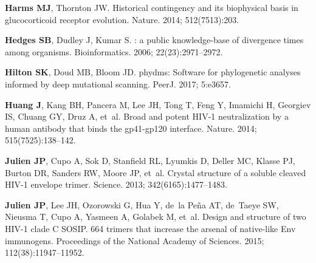 \documentclass[9pt]{elife}
\begin{document}
\begin{thebibliography}{114}
\textbf{\color{eLifeMediumGrey} Harms MJ}, Thornton JW.
\newblock Historical contingency and its biophysical basis in glucocorticoid
  receptor evolution.
\newblock Nature.  2014; 512(7513):203.

\textbf{\color{eLifeMediumGrey} Hedges SB}, Dudley J, Kumar S.
: a public knowledge-base of divergence times among
  organisms.
\newblock Bioinformatics.  2006; 22(23):2971--2972.

\textbf{\color{eLifeMediumGrey} Hilton SK}, Doud MB, Bloom JD.
\newblock phydms: Software for phylogenetic analyses informed by deep
  mutational scanning.
\newblock PeerJ.  2017; 5:e3657.

\textbf{\color{eLifeMediumGrey} Huang J}, Kang BH, Pancera M, Lee JH, Tong T,
  Feng Y, Imamichi H, Georgiev IS, Chuang GY, Druz A, et~al.
\newblock Broad and potent HIV-1 neutralization by a human antibody that binds
  the gp41-gp120 interface.
\newblock Nature.  2014; 515(7525):138--142.

\textbf{\color{eLifeMediumGrey} Julien JP}, Cupo A, Sok D, Stanfield RL,
  Lyumkis D, Deller MC, Klasse PJ, Burton DR, Sanders RW, Moore JP, et~al.
\newblock Crystal structure of a soluble cleaved HIV-1 envelope trimer.
\newblock Science.  2013; 342(6165):1477--1483.

\textbf{\color{eLifeMediumGrey} Julien JP}, Lee JH, Ozorowski G, Hua Y, de~la
  Pe{\~n}a AT, de~Taeye SW, Nieusma T, Cupo A, Yasmeen A, Golabek M, et~al.
\newblock Design and structure of two HIV-1 clade C SOSIP. 664 trimers that
  increase the arsenal of native-like Env immunogens.
\newblock Proceedings of the National Academy of Sciences.  2015;
  112(38):11947--11952.


\end{thebibliography}
\end{document}
